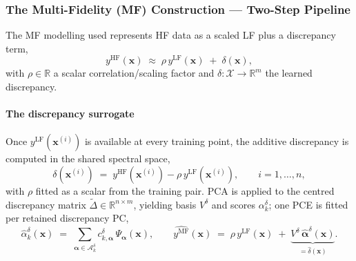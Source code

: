 \documentclass[11pt,a4paper]{article}
\newcommand{\researchq}[1]{%
  \par\smallskip\noindent
  \textbf{\textcolor{blue}{Research question.}}\,\textit{#1}\par\smallskip}
\newcommand{\thref}[1]{{\color{teal}\textit{Thesis: #1}}}
\newcommand{\litref}[1]{{\color{violet}\textit{See: #1}}}
\newcommand{\xv}{\bm{x}}
\newcommand{\yhf}{y^{\mathrm{HF}}}
\newcommand{\ylf}{y^{\mathrm{LF}}}
\newcommand{\ymf}{y^{\mathrm{MF}}}
\begin{document}
\subsubsection{The Multi-Fidelity (MF) Construction --- Two-Step Pipeline}
The MF modelling used represents HF data as a scaled LF plus a discrepancy term,
\[
\yhf(\xv) \;\approx\; \rho\,\ylf(\xv) \;+\; \delta(\xv),
\]
with $\rho \in \mathbb{R}$ a scalar correlation/scaling factor and $\delta\colon\mathcal{X}\to\mathbb{R}^{m}$ the learned discrepancy. 


\paragraph{The discrepancy surrogate}
Once $\ylf(\xv^{(i)})$ is available at every training point, the additive discrepancy is computed in the shared spectral space,
\[
\delta(\xv^{(i)}) \;=\; \yhf(\xv^{(i)}) - \rho\,\ylf(\xv^{(i)}),
\qquad i = 1,\dots,n,
\]
with $\rho$ fitted as a scalar from the training pair. PCA is applied
to the centred discrepancy matrix $\tilde\Delta\in\mathbb{R}^{n\times m}$,
yielding basis $V^{\delta}$ and scores $\alpha^{\delta}_{k}$; one PCE
is fitted per retained discrepancy PC,
\[
\hat\alpha^{\delta}_{k}(\xv) \;=\;
\sum_{\bm{\alpha}\in\mathcal{A}^{\delta}_{k}}
c^{\delta}_{k,\bm{\alpha}}\,\Psi_{\bm{\alpha}}(\xv),
\qquad
\hat{\ymf}(\xv) \;=\; \rho\,\ylf(\xv)
\;+\; \underbrace{V^{\delta}\,\hat{\bm\alpha}^{\delta}(\xv)}_{=\hat\delta(\xv)}.
\]
\end{document}

